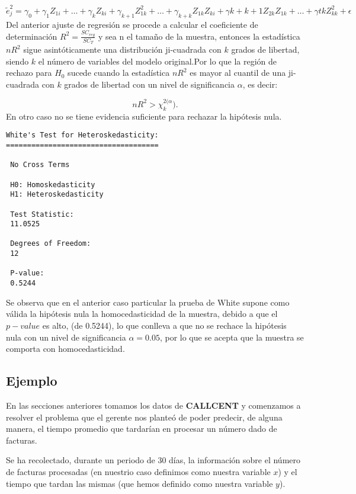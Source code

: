 \documentclass[
  a4paper,
  oneside,
  openany]{book}
\begin{document}
\[\tilde{e}_{j}^{2}=\gamma_{0}+\gamma_{1}Z_{1i}+ \ldots + \gamma_{k}Z_{ki}+\gamma_{k+1}Z^2_{1k}+\ldots + \gamma_{k+k}Z_{1k}Z_{ki}+\gamma{k+k+1}Z_{2k}Z_{1k}+\ldots + \gamma{tk}Z^2_{kk}+\epsilon\]
Del anterior ajuste de regresión se procede a calcular el coeficiente de determinación \(R^2=\frac{SC_{reg}}{SC_{T}}\) y sea n el tamaño de la muestra, entonces la estadística \(nR^2\) sigue asintóticamente una distribución ji-cuadrada con \(k\) grados de libertad, siendo \(k\) el número de variables del modelo original.Por lo que la región de rechazo para \(H_0\) sucede cuando la estadística \(nR^2\) es mayor al cuantil de una ji-cuadrada con \(k\) grados de libertad con un nivel de significancia \(\alpha\), es decir:

\[nR^2>\chi^{2(\alpha}_{k}).\]
En otro caso no se tiene evidencia suficiente para rechazar la hipótesis nula.

\begin{verbatim}
White's Test for Heteroskedasticity:
==================================== 

 No Cross Terms

 H0: Homoskedasticity
 H1: Heteroskedasticity

 Test Statistic:
 11.0525 

 Degrees of Freedom:
 12 

 P-value:
 0.5244 
\end{verbatim}

Se observa que en el anterior caso particular la prueba de White supone como válida la hipótesis nula la homocedasticidad de la muestra, debido a que el \(p-value\) es alto, (de 0.5244), lo que conlleva a que no se rechace la hipótesis nula con un nivel de significancia \(\alpha=0.05\), por lo que se acepta que la muestra se comporta con homocedasticidad.

\hypertarget{ejemplo-18}{%
\subsection{Ejemplo}\label{ejemplo-18}}

En las secciones anteriores tomamos los datos de \textbf{CALLCENT} y comenzamos a resolver el problema que el gerente nos planteó de poder
predecir, de alguna manera, el tiempo promedio que tardarían en procesar un número dado de facturas.

Se ha recolectado, durante un periodo de 30 días, la información sobre el número de facturas procesadas (en nuestrio caso definimos como nuestra variable \(x\)) y el tiempo que tardan las mismas (que hemos definido como nuestra variable \(y\)).
\end{document}
